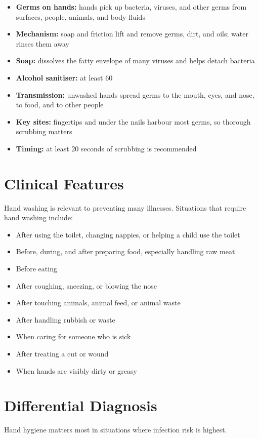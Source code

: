 \begin{itemize}
    \item \textbf{Germs on hands:} hands pick up bacteria, viruses, and other germs from surfaces, people, animals, and body fluids
    \item \textbf{Mechanism:} soap and friction lift and remove germs, dirt, and oils; water rinses them away
    \item \textbf{Soap:} dissolves the fatty envelope of many viruses and helps detach bacteria
    \item \textbf{Alcohol sanitiser:} at least 60%
    \item \textbf{Transmission:} unwashed hands spread germs to the mouth, eyes, and nose, to food, and to other people
    \item \textbf{Key sites:} fingertips and under the nails harbour most germs, so thorough scrubbing matters
    \item \textbf{Timing:} at least 20 seconds of scrubbing is recommended
\end{itemize}

\section*{Clinical Features}
Hand washing is relevant to preventing many illnesses. Situations that require hand washing include:

\begin{itemize}
    \item After using the toilet, changing nappies, or helping a child use the toilet
    \item Before, during, and after preparing food, especially handling raw meat
    \item Before eating
    \item After coughing, sneezing, or blowing the nose
    \item After touching animals, animal feed, or animal waste
    \item After handling rubbish or waste
    \item When caring for someone who is sick
    \item After treating a cut or wound
    \item When hands are visibly dirty or greasy
\end{itemize}

\section*{Differential Diagnosis}
Hand hygiene matters most in situations where infection risk is highest.

